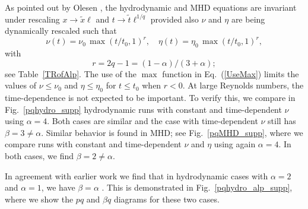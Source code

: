 \documentclass[prl,twocolumn,aps,psfig,showpacs,nofootinbib,nobibnotes,superscriptaddress,preprintnumbers,times]{revtex4}
\newcommand{\EQ}{\begin{equation}}
\newcommand{\EN}{\end{equation}}
\newcommand{\Fig}[1]{Fig.~\ref{#1}}
\newcommand{\Tab}[1]{Table~\ref{#1}}
\newcommand{\Eq}[1]{Eq.~(\ref{#1})}
\begin{document}
As pointed out by Olesen \cite{Ole97}, the hydrodynamic and MHD
equations are invariant under rescaling $x\to\tilde{x}\ell$ and
$t\to\tilde{t}\ell^{1/q}$ provided also $\nu$ and $\eta$ are
being dynamically rescaled such that
\EQ
\nu(t)=\nu_0\,\max(t/t_0,1)^r,\quad
\eta(t)=\eta_0\,\max(t/t_0,1)^r,
\label{UseMax}
\EN
with
\EQ
r=2q-1=(1-\alpha)/(3+\alpha);
\EN
see \Tab{TRofAlp}.
The use of the $\max$ function in \Eq{UseMax} limits the values of
$\nu\leq\nu_0$ and $\eta\leq\eta_0$ for $t\leq t_0$ when $r<0$.
At large Reynolds numbers, the time-dependence is not expected to be
important.
To verify this, we compare in \Fig{pqhydro_supp} hydrodynamic runs
with constant and time-dependent $\nu$ using $\alpha=4$.
Both cases are similar and the case with time-dependent $\nu$
still has $\beta=3\neq\alpha$.
Similar behavior is found in MHD; see \Fig{pqMHD_supp},
where we compare runs with constant and time-dependent $\nu$ and $\eta$
using again $\alpha=4$.
In both cases, we find $\beta=2\neq\alpha$.

In agreement with earlier work we find that in hydrodynamic cases
with $\alpha=2$ and $\alpha=1$, we have $\beta=\alpha$ \cite{YHB04}.
This is demonstrated in \Fig{pqhydro_alp_supp}, where we show the $pq$
and $\beta q$ diagrams for these two cases.
\end{document}
